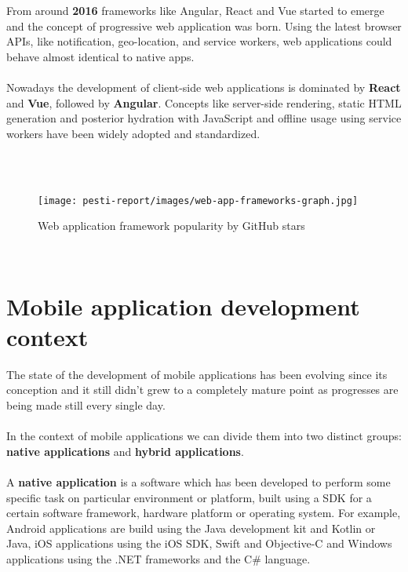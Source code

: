\\ \\
From around \textbf{2016} frameworks like Angular, React and Vue started to emerge and the concept of progressive web application was born. Using the latest browser APIs, like notification, geo-location, and service workers, web applications could behave almost identical to native apps.
\\ \\
Nowadays the development of client-side web applications is dominated by \textbf{React} and \textbf{Vue}, followed by \textbf{Angular}. Concepts like server-side rendering, static HTML generation and posterior hydration with JavaScript and offline usage using service workers have been widely adopted and standardized.

\\ \\
\begin{figure}[H]
	\centering
	\texttt{[image: pesti-report/images/web-app-frameworks-graph.jpg]}
	\caption{Web application framework popularity by GitHub stars}
	\label{fig:web-app-frameworks-graph}
\end{figure}
\\

\section{Mobile application development context}

The state of the development of mobile applications has been evolving since its conception and it still didn't grew to a completely mature point as progresses are being made still every single day.
\\ \\
In the context of mobile applications we can divide them into two distinct groups: \textbf{native applications} and \textbf{hybrid applications}.
\\ \\
A \textbf{native application} is a software which has been developed to perform some specific task on particular environment or platform, built using a SDK for a certain software framework, hardware platform or operating system. For example, Android applications are build using the Java development kit and Kotlin or Java, iOS applications using the iOS SDK, Swift and Objective-C and Windows applications using the .NET frameworks and the C# language.
\\


